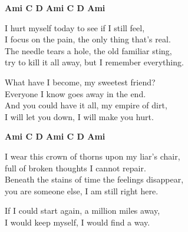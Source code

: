 
\re{}
{\footnotesize\textbf{Ami C D Ami C D Ami}}

\ve{}
I hurt myself today to see if I still feel,\\
I focus on the pain, the only thing that's real.\\
The needle tears a hole, the old familiar sting,\\
try to kill it all away, but I remember everything.

\cho{}
What have I become, my sweetest friend?\\
Everyone I know goes away in the end.\\
And you could have it all, my empire of dirt,\\
I will let you down, I will make you hurt.

\re{}
{\footnotesize\textbf{Ami C D Ami C D Ami}}

\ve{}
I wear this crown of thorns upon my liar's chair,\\
full of broken thoughts I cannot repair.\\
Beneath the stains of time the feelings disappear,\\
you are someone else, I am still right here.

\cho{}

\ve{}
If I could start again, a million miles away,\\
I would keep myself, I would find a way.

\esong{}
